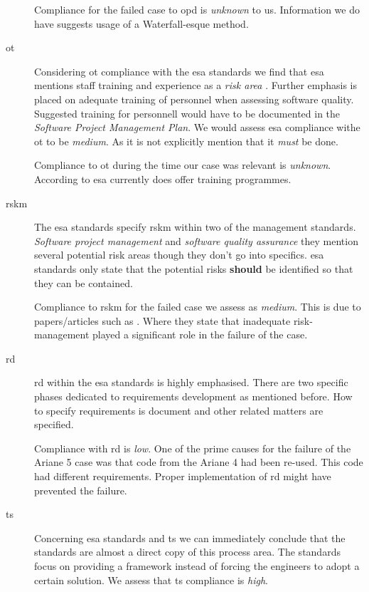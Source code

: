 \begin{description}
Compliance for the failed case to \ac{opd} is \textit{unknown} to us. Information we do have suggests usage of a Waterfall-esque method. 

\item[\ac{ot}]
Considering \ac{ot} compliance with the \ac{esa} standards we find that \ac{esa} mentions staff training and experience as a \textit{risk area} \citep[76]{esaSEstandards1991}. Further emphasis is placed on adequate training of personnel when assessing software quality. Suggested training for personnell would have to be documented in the \textit{Software Project Management Plan}.
We would assess \ac{esa} compliance withe \ac{ot} to be \textit{medium}. As it is not explicitly mention that it \textit{must} be done.

Compliance to \ac{ot} during the time our case was relevant is \textit{unknown}. According to \citep{esatraining2016} \ac{esa} currently does offer training programmes. 

\item[\ac{rskm}]
The \ac{esa} standards specify \ac{rskm} within two of the management standards. \textit{Software project management} and \textit{software quality assurance} they mention several potential risk areas though they don't go into specifics. \ac{esa} standards only state that the potential risks \textbf{should} be identified so that they can be contained.

Compliance to \ac{rskm} for the failed case we assess as \textit{medium}. This is due to papers/articles such as \citep{nuseibeh1997ariane}. Where they state that inadequate risk-management played a significant role in the failure of the case.

\item[\ac{rd}]
\ac{rd} within the \ac{esa} standards is highly emphasised. There are two specific phases dedicated to requirements development as mentioned before. How to specify requirements is document and other related matters are specified.

Compliance with \ac{rd} is \textit{low}. One of the prime causes for the failure of the Ariane 5 case was that code from the Ariane 4 had been re-used. This code had different requirements. Proper implementation of \ac{rd} might have prevented the failure.

\item[\ac{ts}]
Concerning \ac{esa} standards and \ac{ts} we can immediately conclude that the standards are almost a direct copy of this process area. The standards focus on providing a framework instead of forcing the engineers to adopt a certain solution. 
We assess that \ac{ts} compliance is \textit{high}.


\end{description}
